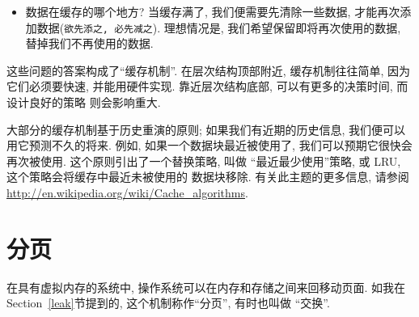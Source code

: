 \documentclass[12pt]{book}
\begin{document}
{\begin{itemize}
\item 数据在缓存的哪个地方? 当缓存满了, 我们便需要先清除一些数据, 
才能再次添加数据({\tt 欲先添之, 必先减之}). 
理想情况是, 我们希望保留即将再次使用的数据, 替掉我们不再使用的数据.

\end{itemize}

这些问题的答案构成了``缓存机制''. 在层次结构顶部附近, 
缓存机制往往简单, 因为它们必须要快速, 并能用硬件实现. 
靠近层次结构底部, 可以有更多的决策时间, 而设计良好的策略
则会影响重大.

大部分的缓存机制基于历史重演的原则; 如果我们有近期的历史信息,
我们便可以用它预测不久的将来. 例如, 如果一个数据块最近被使用了, 
我们可以预期它很快会再次被使用. 这个原则引出了一个替换策略, 叫做
``最近最少使用''策略, 或 LRU, 这个策略会将缓存中最近未被使用的
数据块移除. 有关此主题的更多信息, 请参阅\url{http://en.wikipedia.org/wiki/Cache_algorithms}.


\section{分页}
\label{paging}

在具有虚拟内存的系统中, 操作系统可以在内存和存储之间来回移动页面.
如我在Section~\ref{leak}节提到的, 这个机制称作``分页'', 有时也叫做
``交换''.

}
\end{document}
